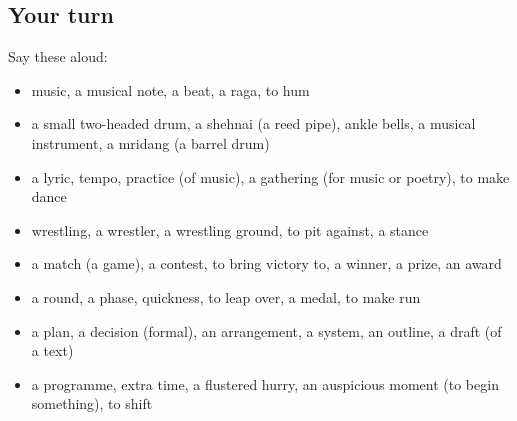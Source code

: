 \subsection*{Your turn}
Say these aloud:

\begin{itemize}
\raggedright
  \item music, a musical note, a beat, a raga, to hum
  \item a small two-headed drum, a shehnai (a reed pipe), ankle bells, a musical instrument, a mridang (a barrel drum)
  \item a lyric, tempo, practice (of music), a gathering (for music or poetry), to make dance
  \item wrestling, a wrestler, a wrestling ground, to pit against, a stance
  \item a match (a game), a contest, to bring victory to, a winner, a prize, an award
  \item a round, a phase, quickness, to leap over, a medal, to make run
  \item a plan, a decision (formal), an arrangement, a system, an outline, a draft (of a text)
  \item a programme, extra time, a flustered hurry, an auspicious moment (to begin something), to shift
\end{itemize}

